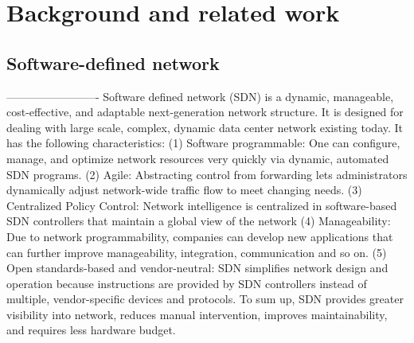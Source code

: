 \chapter{Background and related work}

\section{Software-defined network}
\label{sec:payload}


-------------------------
Software defined network (SDN) is a dynamic, manageable, cost-effective, and adaptable next-generation network structure. It is designed for dealing with large scale, complex, dynamic data center network existing today. It has the following characteristics: (1) Software programmable: One can configure, manage, and optimize network resources very quickly via dynamic, automated SDN programs. (2) Agile: Abstracting control from forwarding lets administrators dynamically adjust network-wide traffic flow to meet changing needs. (3) Centralized Policy Control: Network intelligence is centralized in software-based SDN controllers that maintain a global view of the network (4) Manageability: Due to network programmability, companies can develop new applications that can further improve manageability, integration, communication and so on. (5) Open standards-based and vendor-neutral: SDN simplifies network design and operation because instructions are provided by SDN controllers instead of multiple, vendor-specific devices and protocols\cite{SDN_WIKI}. To sum up, SDN provides greater visibility into network, reduces manual intervention, improves maintainability, and requires less hardware budget.

